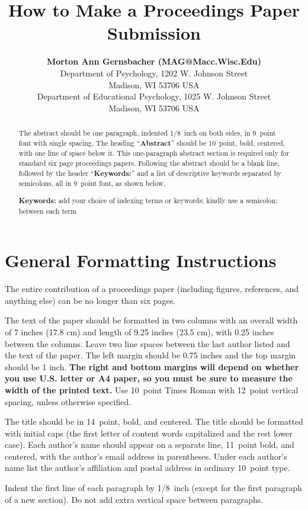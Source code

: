 \documentclass[10pt,letterpaper]{article}
\title{How to Make a Proceedings Paper Submission}
\author{{\large \bf Morton Ann Gernsbacher (MAG@Macc.Wisc.Edu)} \\
  Department of Psychology, 1202 W. Johnson Street \\
  Madison, WI 53706 USA
  \AND {\large \bf Sharon J.~Derry (SDJ@Macc.Wisc.Edu)} \\
  Department of Educational Psychology, 1025 W. Johnson Street \\
  Madison, WI 53706 USA}
\begin{document}
\maketitle


\begin{abstract}
The abstract should be one paragraph, indented 1/8~inch on both sides,
in 9~point font with single spacing. The heading ``{\bf Abstract}''
should be 10~point, bold, centered, with one line of space below
it. This one-paragraph abstract section is required only for standard
six page proceedings papers. Following the abstract should be a blank
line, followed by the header ``{\bf Keywords:}'' and a list of
descriptive keywords separated by semicolons, all in 9~point font, as
shown below.

\textbf{Keywords:} 
add your choice of indexing terms or keywords; kindly use a
semicolon; between each term
\end{abstract}


\section{General Formatting Instructions}

The entire contribution of a proceedings paper (including figures,
references, and anything else) can be no longer than six pages.

The text of the paper should be formatted in two columns with an
overall width of 7 inches (17.8 cm) and length of 9.25 inches (23.5
cm), with 0.25 inches between the columns. Leave two line spaces
between the last author listed and the text of the paper. The left
margin should be 0.75 inches and the top margin should be 1 inch.
\textbf{The right and bottom margins will depend on whether you use
  U.S. letter or A4 paper, so you must be sure to measure the width of
  the printed text.} Use 10~point Times Roman with 12~point vertical
spacing, unless otherwise specified.

The title should be in 14~point, bold, and centered. The title should
be formatted with initial caps (the first letter of content words
capitalized and the rest lower case). Each author's name should appear
on a separate line, 11~point bold, and centered, with the author's
email address in parentheses. Under each author's name list the
author's affiliation and postal address in ordinary 10~point type.

Indent the first line of each paragraph by 1/8~inch (except for the
first paragraph of a new section). Do not add extra vertical space
between paragraphs.
\end{document}
